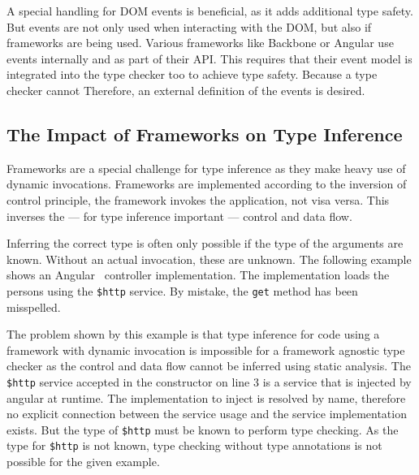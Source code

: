 A special handling for DOM events is beneficial, as it adds additional type safety. But events are not only used when interacting with the DOM, but also if frameworks are being used. Various frameworks like Backbone or Angular use events internally and as part of their API.  This requires that their event model is integrated into the type checker too to achieve type safety. Because a type checker cannot Therefore, an external definition of the events is desired.

\subsection{The Impact of Frameworks on Type Inference}
Frameworks are a special challenge for type inference as they make heavy use of dynamic invocations.  Frameworks are implemented according to the inversion of control principle, the framework invokes the application, not visa versa. This inverses the --- for type inference important --- control and data flow. 

Inferring the correct type is often only possible if the type of the arguments are known. Without an actual invocation, these are unknown. The following example shows an Angular~\cite{Angular} controller implementation. The implementation loads the persons using the \texttt{\$http} service. By mistake, the \texttt{get} method has been misspelled. 


The problem shown by this example is that type inference for code using a framework with dynamic invocation is impossible for a framework agnostic type checker as the control and data flow cannot be inferred using static analysis. The \texttt{\$http} service accepted in the constructor on line 3 is a service that is injected by angular at runtime. The implementation to inject is resolved by name, therefore no explicit connection between the service usage and the service implementation exists. But the type of \texttt{\$http} must be known to perform type checking. As the type for \texttt{\$http} is not known, type checking without type annotations is not possible for the given example.
